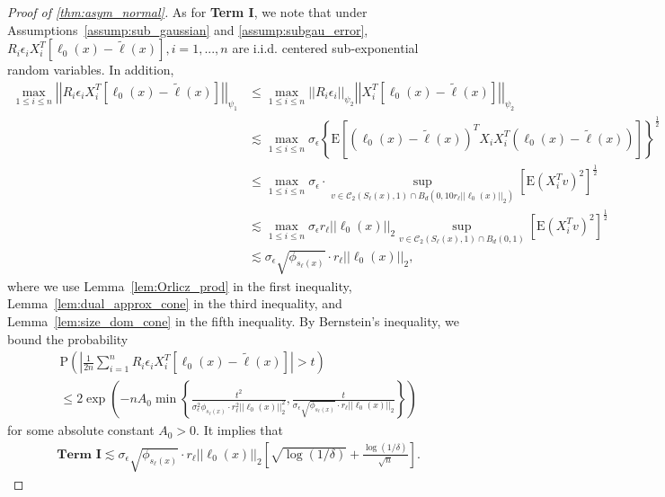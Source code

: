 \documentclass[ejsv2,noshowframe]{imsart}
\theoremstyle{plain}
\theoremstyle{definition}
\theoremstyle{remark}
\newcommand{\norm}[1]{\left|\left| #1 \right|\right|}
\renewcommand{\tilde}{\widetilde}
\begin{document}
\begin{proof}[Proof of \autoref{thm:asym_normal}]
	As for \textbf{Term I}, we note that under Assumptions~\ref{assump:sub_gaussian} and \ref{assump:subgau_error}, $R_i\epsilon_i X_i^T\left[\ell_0(x) - \tilde{\ell}(x)\right], i=1,...,n$ are i.i.d. centered sub-exponential random variables. In addition,
	\begin{align*}
		\max_{1\leq i \leq n} \norm{R_i\epsilon_i X_i^T\left[\ell_0(x) - \tilde{\ell}(x)\right]}_{\psi_1} &\leq \max_{1\leq i \leq n} \norm{R_i\epsilon_i}_{\psi_2} \norm{X_i^T\left[\ell_0(x) - \tilde{\ell}(x)\right]}_{\psi_2}\\
		&\lesssim \max_{1 \leq i \leq n} \sigma_{\epsilon} \left\{\mathrm{E}\left[\left(\ell_0(x) - \tilde{\ell}(x)\right)^T X_iX_i^T \left(\ell_0(x) - \tilde{\ell}(x)\right)\right]\right\}^{\frac{1}{2}}\\
		&\leq \max_{1 \leq i \leq n}\sigma_{\epsilon} \cdot \sup_{v \in \mathcal{C}_2(S_{\ell}(x),1)\cap B_d\left(0, 10r_{\ell}\norm{\ell_0(x)}_2\right)} \left[\mathrm{E}\left(X_i^T v\right)^2\right]^{\frac{1}{2}}\\
		&\lesssim \max_{1 \leq i \leq n} \sigma_{\epsilon}r_{\ell} \norm{\ell_0(x)}_2 \sup_{v \in \mathcal{C}_2(S_{\ell}(x),1)\cap B_d\left(0,1\right)} \left[\mathrm{E}\left(X_i^T v\right)^2\right]^{\frac{1}{2}}\\
		&\lesssim \sigma_{\epsilon} \sqrt{\phi_{s_{\ell}(x)}} \cdot r_{\ell} \norm{\ell_0(x)}_2,
	\end{align*}
	where we use Lemma~\ref{lem:Orlicz_prod} in the first inequality, Lemma~\ref{lem:dual_approx_cone} in the third inequality, and Lemma~\ref{lem:size_dom_cone} in the fifth inequality. By Bernstein's inequality, we bound the probability
	\begin{align*}
		&\mathrm{P}\left(\left|\frac{1}{2n} \sum_{i=1}^n R_i\epsilon_i X_i^T\left[\ell_0(x) - \tilde{\ell}(x)\right]\right| > t \right) \\
		& \leq 2\exp\left(-nA_0\min\left\{\frac{t^2}{\sigma_{\epsilon}^2 \phi_{s_{\ell}(x)} \cdot r_{\ell}^2 \norm{\ell_0(x)}_2^2}, \frac{t}{\sigma_{\epsilon} \sqrt{\phi_{s_{\ell}(x)}} \cdot r_{\ell} \norm{\ell_0(x)}_2} \right\} \right)
	\end{align*}
	for some absolute constant $A_0 >0$. It implies that
	\begin{align*}
		&\textbf{Term I} \lesssim \sigma_{\epsilon} \sqrt{\phi_{s_{\ell}(x)}} \cdot r_{\ell} \norm{\ell_0(x)}_2 \left[\sqrt{\log(1/\delta)} + \frac{\log(1/\delta)}{\sqrt{n}} \right].
	\end{align*}
	

\end{proof}
\end{document}
